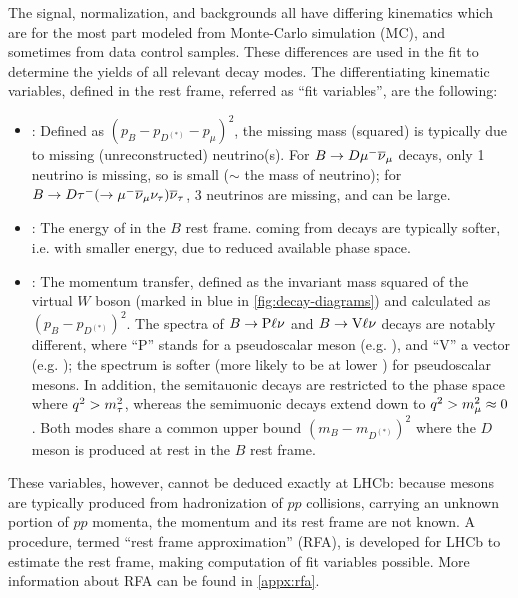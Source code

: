 The signal, normalization, and backgrounds all have differing kinematics
which are for the most part modeled from Monte-Carlo simulation (MC),
and sometimes from data control samples.
These differences are used in the fit to determine the yields of all
relevant decay modes.
The differentiating kinematic variables, defined in the \B rest frame,
referred as ``fit variables'',
are the following:
\begin{itemize}
    \item \mmSq: Defined as $(p_B - p_{D^{(*)}} - p_\mu)^2$,
        the missing mass (squared) is typically due to missing (unreconstructed)
        neutrino(s).
        For $B \rightarrow D {\mu^-} {{\overline{\nu}}_\mu}$ decays, only 1 neutrino is missing,
        so \mmSq is small ($\sim$ the mass of neutrino);
        for $B \rightarrow D {\tau^-} (\rightarrow {\ensuremath{\mu^-}}{\ensuremath{{\overline{\nu}}_\mu}}{\ensuremath{{\nu}_\tau}}) {{\overline{\nu}}_\tau}$,
        3 neutrinos are missing, and \mmSq can be large.
    \item \el: The energy of \mun in the $B$ rest frame.
        \mun coming from \taum decays are typically
        softer, i.e. with smaller energy, due to reduced available phase space.
    \item \qSq: The momentum transfer, defined as the invariant mass squared
        of the virtual $W$ boson (marked in blue in \cref{fig:decay-diagrams})
        and calculated as $(p_B - p_{D^{(*)}})^2$.
        The \qSq spectra of
        $B \rightarrow \text{P} \ell{\ensuremath{\nu}}$ and $B \rightarrow \text{V} \ell{\ensuremath{\nu}}$
        decays are notably different,
        where ``P'' stands for a pseudoscalar meson (e.g. \Dz),
        and ``V'' a vector (e.g. \Dstar);
        the \qSq spectrum is softer
        (more likely to be at lower \qSq) for pseudoscalar mesons.
        In addition, the semitauonic decays are restricted to the phase space
        where $q^2 > m^2_\tau$,
        whereas the semimuonic decays extend down to $q^2 > m^2_\mu \approx 0$.
        Both modes share a common \qSq upper bound $(m_B - m_{D^{(*)}})^2$
        where the $D$ meson is produced at rest in the $B$ rest frame.
\end{itemize}
These variables, however, cannot be deduced exactly at LHCb:
because \B mesons
are typically produced from hadronization of $pp$ collisions,
carrying an unknown portion of $pp$ momenta,
the \B momentum and its rest frame are not known.
A procedure, termed ``rest frame approximation'' (RFA), is developed for LHCb
to estimate the \B rest frame, making computation of fit variables possible.
More information about RFA can be found in \cref{appx:rfa}.

